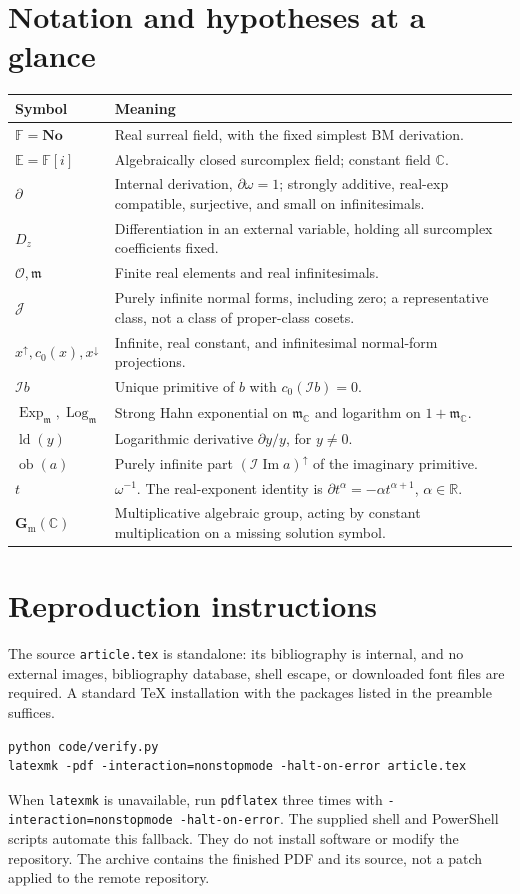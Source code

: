 \documentclass[11pt,a4paper]{article}
\numberwithin{equation}{section}
\theoremstyle{definition}
\theoremstyle{remark}
\newcommand{\No}{\mathbf{No}}
\newcommand{\F}{\mathbb F}
\newcommand{\E}{\mathbb E}
\newcommand{\R}{\mathbb R}
\newcommand{\C}{\mathbb C}
\newcommand{\OO}{\mathcal O}
\newcommand{\mm}{\mathfrak m}
\newcommand{\J}{\mathcal J}
\newcommand{\D}{\partial}
\newcommand{\I}{\mathcal I}
\newcommand{\Ex}{\operatorname{Exp}_{\mm}}
\newcommand{\Lo}{\operatorname{Log}_{\mm}}
\newcommand{\ob}{\operatorname{ob}}
\newcommand{\Imm}{\operatorname{Im}}
\newcommand{\ld}{\operatorname{ld}}
\newcommand{\gm}{\mathbf G_{\mathrm m}}
\newcommand{\up}[1]{#1^{\uparrow}}
\newcommand{\down}[1]{#1^{\downarrow}}
\begin{document}
\appendix
\section{Notation and hypotheses at a glance}\label{app:notation}
\begin{longtable}{@{}P{0.19\textwidth}P{0.74\textwidth}@{}}
\toprule
Symbol & Meaning\\
\midrule\endhead
$\F=\No$ & Real surreal field, with the fixed simplest BM derivation.\\[0.35em]
$\E=\F[i]$ & Algebraically closed surcomplex field; constant field $\C$.\\[0.35em]
$\D$ & Internal derivation, $\D\omega=1$; strongly additive, real-exp
compatible, surjective, and small on infinitesimals.\\[0.35em]
$D_z$ & Differentiation in an external variable, holding all surcomplex
coefficients fixed.\\[0.35em]
$\OO,\mm$ & Finite real elements and real infinitesimals.\\[0.35em]
$\J$ & Purely infinite normal forms, including zero; a representative
class, not a class of proper-class cosets.\\[0.35em]
$\up{x},c_0(x),\down{x}$ & Infinite, real constant, and infinitesimal
normal-form projections.\\[0.35em]
$\I b$ & Unique primitive of $b$ with $c_0(\I b)=0$.\\[0.35em]
$\Ex,\Lo$ & Strong Hahn exponential on $\mm_{\C}$ and logarithm on
$1+\mm_{\C}$.\\[0.35em]
$\ld(y)$ & Logarithmic derivative $\D y/y$, for $y\ne0$.\\[0.35em]
$\ob(a)$ & Purely infinite part $\up{(\I\Imm a)}$ of the imaginary
primitive.\\[0.35em]
$t$ & $\omega^{-1}$. The real-exponent identity is
$\D t^\alpha=-\alpha t^{\alpha+1}$, $\alpha\in\R$.\\[0.35em]
$\gm(\C)$ & Multiplicative algebraic group, acting by constant
multiplication on a missing solution symbol.\\
\bottomrule
\end{longtable}

\section{Reproduction instructions}
The source \texttt{article.tex} is standalone: its bibliography is internal,
and no external images, bibliography database, shell escape, or downloaded
font files are required. A standard TeX installation with the packages
listed in the preamble suffices.
\begin{verbatim}
python code/verify.py
latexmk -pdf -interaction=nonstopmode -halt-on-error article.tex
\end{verbatim}
When \texttt{latexmk} is unavailable, run \texttt{pdflatex} three times with
\texttt{-interaction=nonstopmode -halt-on-error}. The supplied shell and
PowerShell scripts automate this fallback. They do not install software or
modify the repository. The archive contains the finished PDF and its source,
not a patch applied to the remote repository.
\end{document}
